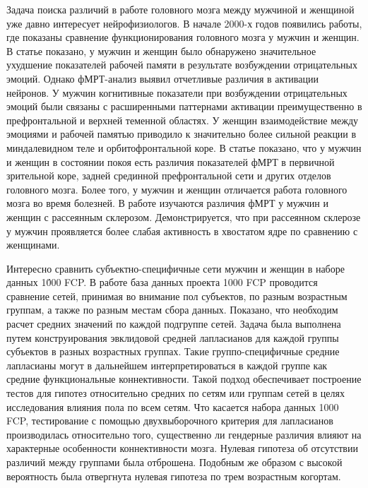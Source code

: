 Задача поиска различий в работе головного мозга между мужчиной и женщиной уже давно интересует нейрофизиологов. В начале 2000-х годов появились работы, где показаны сравнение функционирования головного мозга у мужчин и женщин. В статье \cite{koch2007gender} показано, у мужчин и женщин было обнаружено значительное ухудшение показателей рабочей памяти в результате возбуждении отрицательных эмоций. Однако фМРТ-анализ выявил отчетливые различия в активации нейронов. У мужчин когнитивные показатели при возбуждении отрицательных эмоций были связаны с расширенными паттернами активации преимущественно в префронтальной и верхней теменной областях. У женщин взаимодействие между эмоциями и рабочей памятью приводило к значительно более сильной реакции в миндалевидном теле и орбитофронтальной коре. В статье \cite{xu2015gender} показано, что у мужчин и женщин в состоянии покоя есть различия показателей фМРТ в первичной зрительной коре, задней срединной префронтальной сети и других отделов головного мозга. Более того, у мужчин и женщин отличается работа головного мозга во время болезней. В работе \cite{zang2004regional} изучаются различия фМРТ у мужчин и женщин с рассеянным склерозом. Демонстрируется, что при рассеянном склерозе у мужчин проявляется более слабая активность в хвостатом ядре по сравнению с женщинами.

Интересно сравнить субъектно-специфичные сети мужчин и женщин в наборе данных 1\'000 FCP. В работе \cite{ginestet2017hypothesis} база данных проекта 1000 FCP проводится сравнение сетей, принимая во внимание пол субъектов, по разным возрастным группам, а также по разным местам сбора данных. Показано, что необходим расчет средних значений по каждой подгруппе сетей. Задача была выполнена путем конструирования эвклидовой средней лапласианов для каждой группы субъектов в разных возрастных группах. Такие группо-специфичные средние лапласианы могут в дальнейшем интерпретироваться в каждой группе как средние функциональные коннективности. Такой подход обеспечивает построение тестов для гипотез относительно средних по сетям или группам сетей в целях исследования влияния пола по всем сетям. Что касается набора данных 1000 FCP, тестирование с помощью двухвыборочного критерия для лапласианов производилась относительно того, существенно ли гендерные различия влияют на характерные особенности коннективности мозга. Нулевая гипотеза об отсутствии различий между группами была отброшена. Подобным же образом с высокой вероятность была отвергнута нулевая гипотеза по трем возрастным когортам.

